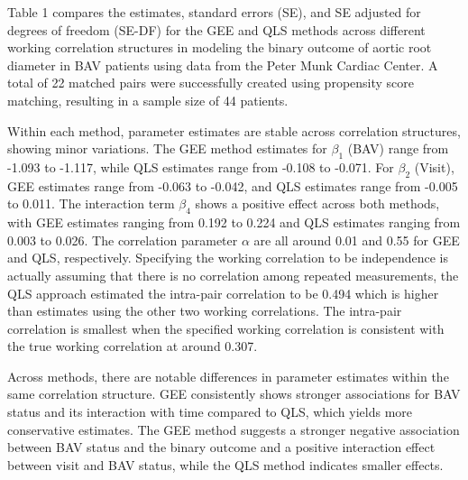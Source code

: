 \documentclass[
]{aft}
\begin{document}
Table 1 compares the estimates, standard errors (SE), and SE adjusted
for degrees of freedom (SE-DF) for the GEE and QLS methods across
different working correlation structures in modeling the binary outcome
of aortic root diameter in BAV patients using data from the Peter Munk
Cardiac Center. A total of 22 matched pairs were successfully created
using propensity score matching, resulting in a sample size of 44
patients.

Within each method, parameter estimates are stable across correlation
structures, showing minor variations. The GEE method estimates for
\(\beta_1\) (BAV) range from -1.093 to -1.117, while QLS estimates range
from -0.108 to -0.071. For \(\beta_2\) (Visit), GEE estimates range from
-0.063 to -0.042, and QLS estimates range from -0.005 to 0.011. The
interaction term \(\beta_4\) shows a positive effect across both
methods, with GEE estimates ranging from 0.192 to 0.224 and QLS
estimates ranging from 0.003 to 0.026. The correlation parameter
\(\alpha\) are all around 0.01 and 0.55 for GEE and QLS, respectively.
Specifying the working correlation to be independence is actually
assuming that there is no correlation among repeated measurements, the
QLS approach estimated the intra-pair correlation to be 0.494 which is
higher than estimates using the other two working correlations. The
intra-pair correlation is smallest when the specified working
correlation is consistent with the true working correlation at around
0.307.

Across methods, there are notable differences in parameter estimates
within the same correlation structure. GEE consistently shows stronger
associations for BAV status and its interaction with time compared to
QLS, which yields more conservative estimates. The GEE method suggests a
stronger negative association between BAV status and the binary outcome
and a positive interaction effect between visit and BAV status, while
the QLS method indicates smaller effects.
\end{document}
